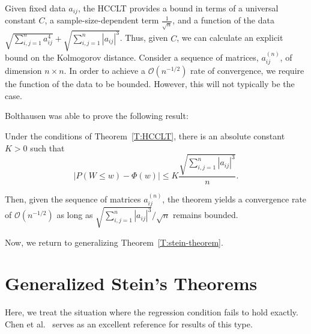 Given fixed data $a_{ij}$, the HCCLT provides a bound in terms of a universal
constant $C$, a sample-size-dependent term $\frac{1}{\sqrt{n}}$,
and a function of the data
$\sqrt{\sum_{i, j = 1}^{n} a_{ij}^4} + \sqrt{\sum_{i, j = 1}^{n} |a_{ij}|^3}$.
Thus, given $C$, we can calculate an explicit bound on the Kolmogorov distance.
Consider a sequence of matrices, $a_{ij}^{(n)}$, of dimension $n \times n$.
In order to achieve a $\mathcal{O}(n^{-1/2})$ rate of convergence, we require the
function of the data to be bounded.  However, this will not typically be the case.

Bolthausen \cite{bolthausen1984estimate} was able to prove the following result:
\begin{theorem}[Bolthausen]
  Under the conditions of Theorem~\ref{T:HCCLT}, there is an absolute constant
  $K > 0$ such that
  \begin{equation*}
    |P(W \leq w) - \Phi(w)| \leq K \frac{\sqrt{\sum_{i, j = 1}^{n} |a_{ij}|^3}}{n}.
  \end{equation*}
\end{theorem}

Then, given the sequence of matrices $a_{ij}^{(n)}$, the theorem
yields a convergence rate of $\mathcal{O}(n^{-1/2})$ as long as
$\sqrt{\sum_{i, j = 1}^{n} |a_{ij}|^3} / \sqrt{n}$ remains bounded.

Now, we return to generalizing Theorem~\ref{T:stein-theorem}.


\section{Generalized Stein's Theorems}
Here, we treat the situation where the regression condition fails to hold exactly.
Chen et al.\ \cite{chen2010normal} serves as an excellent reference for results
of this type.

